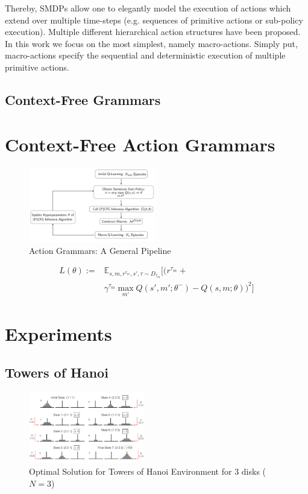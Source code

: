 \documentclass{article}
\begin{document}
Thereby, SMDPs allow one to elegantly model the execution of actions which extend over multiple time-steps (e.g. sequences of primitive actions or sub-policy execution). Multiple different hierarchical action structures have been proposed. In this work we focus on the most simplest, namely macro-actions. Simply put, macro-actions specify the sequential and deterministic execution of multiple primitive actions.  

\subsection{Context-Free Grammars}


\newpage
\section{Context-Free Action Grammars}

\begin{figure}[H]
    \centering
    \includegraphics[width=0.495\textwidth]{figures/concept_online_macro_learning.png}
    \caption{Action Grammars: A General Pipeline}
    \label{fig:my_label}
\end{figure}

\begin{align*}
    L(\theta) := &\mathbb{E}_{s,m,r^{\tau_m},s', \tau \sim D_{\tau_m}} [(r^{\tau_m} + \\ & \gamma^{\tau_m} \max_{m'} Q(s',m';\theta^-) - Q(s,m; \theta))^2]
\end{align*}


\newpage
\section{Experiments}

\subsection{Towers of Hanoi}

\begin{figure}[H]
    \centering
    \includegraphics[width=0.45\textwidth]{figures/hanoi_problem.png}
    \caption{Optimal Solution for Towers of Hanoi Environment for 3 disks ($N=3$)}
    \label{fig:my_label}
\end{figure}
\end{document}
